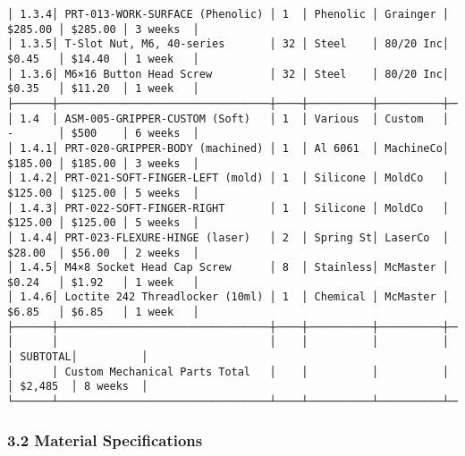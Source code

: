 \documentclass[
]{article}
\begin{document}
\begin{verbatim}
│ 1.3.4│ PRT-013-WORK-SURFACE (Phenolic) │ 1  │ Phenolic │ Grainger │ $285.00 │ $285.00 │ 3 weeks  │
│ 1.3.5│ T-Slot Nut, M6, 40-series       │ 32 │ Steel    │ 80/20 Inc│ $0.45   │ $14.40  │ 1 week   │
│ 1.3.6│ M6×16 Button Head Screw         │ 32 │ Steel    │ 80/20 Inc│ $0.35   │ $11.20  │ 1 week   │
├──────┼─────────────────────────────────┼────┼──────────┼──────────┼─────────┼─────────┼──────────┤
│ 1.4  │ ASM-005-GRIPPER-CUSTOM (Soft)   │ 1  │ Various  │ Custom   │ -       │ $500    │ 6 weeks  │
│ 1.4.1│ PRT-020-GRIPPER-BODY (machined) │ 1  │ Al 6061  │ MachineCo│ $185.00 │ $185.00 │ 3 weeks  │
│ 1.4.2│ PRT-021-SOFT-FINGER-LEFT (mold) │ 1  │ Silicone │ MoldCo   │ $125.00 │ $125.00 │ 5 weeks  │
│ 1.4.3│ PRT-022-SOFT-FINGER-RIGHT       │ 1  │ Silicone │ MoldCo   │ $125.00 │ $125.00 │ 5 weeks  │
│ 1.4.4│ PRT-023-FLEXURE-HINGE (laser)   │ 2  │ Spring St│ LaserCo  │ $28.00  │ $56.00  │ 2 weeks  │
│ 1.4.5│ M4×8 Socket Head Cap Screw      │ 8  │ Stainless│ McMaster │ $0.24   │ $1.92   │ 1 week   │
│ 1.4.6│ Loctite 242 Threadlocker (10ml) │ 1  │ Chemical │ McMaster │ $6.85   │ $6.85   │ 1 week   │
├──────┼─────────────────────────────────┼────┼──────────┼──────────┼─────────┼─────────┼──────────┤
│      │                                 │    │          │          │         │ SUBTOTAL│          │
│      │ Custom Mechanical Parts Total   │    │          │          │         │ $2,485  │ 8 weeks  │
└──────┴─────────────────────────────────┴────┴──────────┴──────────┴─────────┴─────────┴──────────┘
\end{verbatim}

\hypertarget{material-specifications}{%
\subsubsection{3.2 Material
Specifications}\label{material-specifications}}
\end{document}
